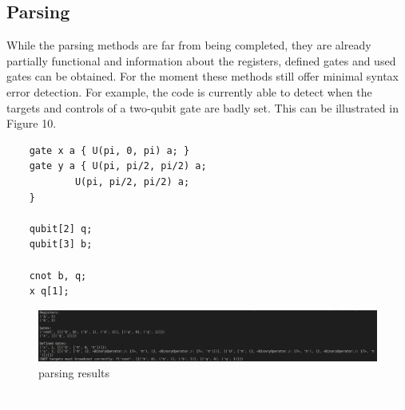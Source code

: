 \subsection{Parsing}
While the parsing methods are far from being completed, they are already partially functional and information about the registers, defined gates and used gates can be obtained.
For the moment these methods still offer minimal syntax error detection. For example, the code is currently able to detect when the targets and controls of a two-qubit gate are badly set.
This can be illustrated in Figure 10.
\begin{lstlisting}
    gate x a { U(pi, 0, pi) a; }
    gate y a { U(pi, pi/2, pi/2) a; 
            U(pi, pi/2, pi/2) a;
    }
    
    qubit[2] q;
    qubit[3] b;
    
    cnot b, q;
    x q[1];
\end{lstlisting}

\begin{figure}[H]
    \centering
    \includegraphics[width=180mm]{Images/parsing.png}\hfill
    \caption{parsing results}
    \label{fig:parsers}
\end{figure}
 \textcolor{white}{h}
